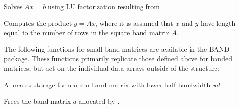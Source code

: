 \documentclass[letterpaper,10pt,english]{sphinxmanual}
\begin{document}

\begin{fulllineitems}
\label{linear_solvers/DLS:BandGBTRS}
Solves $Ax = b$ using LU factorization resulting from
{\hyperref[linear_solvers/DLS:BandGBTRF]{}}.

\end{fulllineitems}


\begin{fulllineitems}
\label{linear_solvers/DLS:BandMatvec}
Computes the product $y = Ax$, where it is assumed that
$x$ and $y$ have length equal to the number of rows in
the square band matrix $A$.

\end{fulllineitems}


The following functions for small band matrices are available in the
BAND package.  These functions primarily replicate those defined above
for {\hyperref[linear_solvers/DLS:DlsMat]{}} banded matrices, but act on the individual data arrays
outside of the {\hyperref[linear_solvers/DLS:DlsMat]{}} structure:

\begin{fulllineitems}
\label{linear_solvers/DLS:newBandMat}
Allocates storage for a $n \times n$ band matrix with lower
half-bandwidth \emph{ml}.

\end{fulllineitems}


\begin{fulllineitems}
Frees the band matrix \emph{a} allocated by {\hyperref[linear_solvers/DLS:newBandMat]{}}.

\end{fulllineitems}

\end{document}
